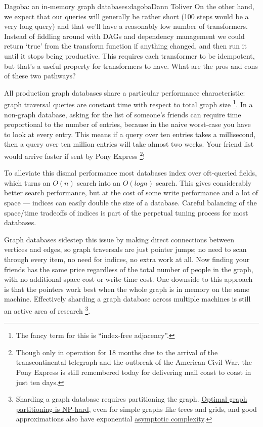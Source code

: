 \begin{aosachapter}{Dagoba: an in-memory graph database}{s:dagoba}{Dann Toliver}
On the other hand, we expect that our queries will generally be rather
short (100 steps would be a very long query) and that we'll have a
reasonably low number of transformers. Instead of fiddling around with
DAGs and dependency management we could return `true' from the transform
function if anything changed, and then run it until it stops being
productive. This requires each transformer to be idempotent, but that's
a useful property for transformers to have. What are the pros and cons
of these two pathways?

\label{performance}

All production graph databases share a particular performance
characteristic: graph traversal queries are constant time with respect
to total graph size \footnote{The fancy term for this is ``index-free
  adjacency''.}. In a non-graph database, asking for the list of
someone's friends can require time proportional to the number of
entries, because in the naive worst-case you have to look at every
entry. This means if a query over ten entries takes a millisecond, then
a query over ten million entries will take almost two weeks. Your friend
list would arrive faster if sent by Pony Express \footnote{Though only
  in operation for 18 months due to the arrival of the transcontinental
  telegraph and the outbreak of the American Civil War, the Pony Express
  is still remembered today for delivering mail coast to coast in just
  ten days.}!

To alleviate this dismal performance most databases index over
oft-queried fields, which turns an $O(n)$ search into an $O(log n)$
search. This gives considerably better search performance, but at the
cost of some write performance and a lot of space --- indices can easily
double the size of a database. Careful balancing of the space/time
tradeoffs of indices is part of the perpetual tuning process for most
databases.

Graph databases sidestep this issue by making direct connections between
vertices and edges, so graph traversals are just pointer jumps; no need
to scan through every item, no need for indices, no extra work at all.
Now finding your friends has the same price regardless of the total
number of people in the graph, with no additional space cost or write
time cost. One downside to this approach is that the pointers work best
when the whole graph is in memory on the same machine. Effectively
sharding a graph database across multiple machines is still an active
area of research \footnote{Sharding a graph database requires
  partitioning the graph.
  \href{http://dl.acm.org/citation.cfm?doid=1007912.1007931}{Optimal
  graph partitioning is NP-hard}, even for simple graphs like trees and
  grids, and good approximations also have exponential
  \href{http://arxiv.org/pdf/1311.3144v2.pdf}{asymptotic complexity}.}.


\end{aosachapter}
